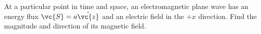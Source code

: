 At a particular point in time and space, 
an electromagnetic plane wave has an energy flux $\vc{S}=a\hat{\vc{z}}$
and an electric field in the $+x$ direction.
Find the magnitude and direction of its magnetic field.\answercheck

